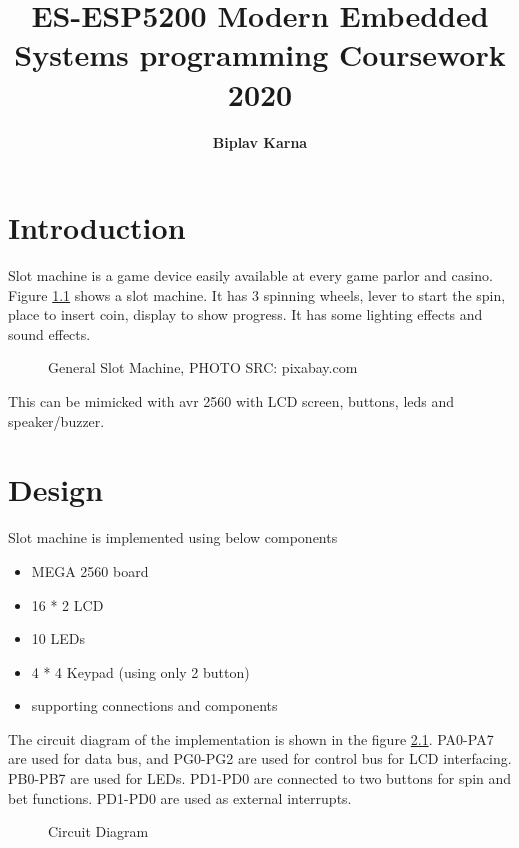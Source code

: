 \documentclass[a4paper,13pt,openany,sffamily]{memoir}
\title{\Huge\bfseries ES-ESP5200 Modern Embedded Systems programming Coursework 2020}
\author{\LARGE \bfseries Biplav Karna}
\begin{document}
\maketitle

\chapter {Introduction}
Slot machine is a game device easily available at every game parlor and casino. Figure \ref{Fig_Casino_Slot_Machine} shows a slot machine. It has 3 spinning wheels, lever to start the spin, place to insert coin, display to show progress. It has some lighting effects and sound effects. 

\begin{figure}[htbp]
\caption{General Slot Machine, PHOTO SRC: pixabay.com}
\label{Fig_Casino_Slot_Machine}
\end{figure}


This can be mimicked with avr 2560 with LCD screen, buttons, leds and speaker/buzzer.


\chapter {Design}
Slot machine is implemented using below components

\begin{itemize}
\item MEGA 2560 board
\item 16 * 2 LCD 
\item 10 LEDs
\item 4 * 4 Keypad (using only 2 button)
\item supporting connections and components 
\end{itemize}

The circuit diagram of the implementation is shown in the figure \ref{Fig_Circuit_Diagram}. PA0-PA7 are used for data bus, and PG0-PG2 are used for control bus for LCD interfacing. PB0-PB7 are used for LEDs. PD1-PD0 are connected to two buttons for spin and bet functions. PD1-PD0 are used as external interrupts. 

\begin{figure}[h]
\caption{Circuit Diagram }
\label{Fig_Circuit_Diagram}
\end{figure}
\end{document}
